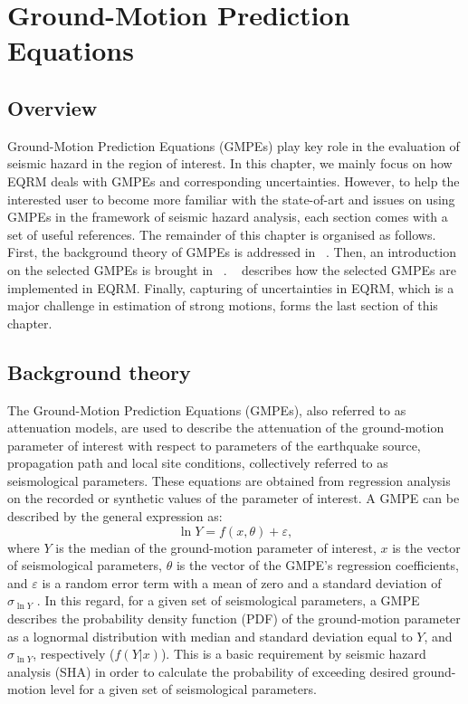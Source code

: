 \chapter{Ground-Motion Prediction Equations}
\label{ch:atten}

\newcommand{\Rhyp}{R_{\mathrm{hyp}}}
\newcommand{\Repi}{R_{\mathrm{epi}}}
\newcommand{\Rrup}{R_{\mathrm{rup}}}
\newcommand{\Rjb}{R_{\mathrm{jb}}}

\section{Overview}

Ground-Motion Prediction Equations (GMPEs) play key role in the
evaluation of seismic hazard in the region of interest. In this
chapter, we mainly focus on how EQRM deals with GMPEs and
corresponding uncertainties. However, to help the interested user to
become more familiar with the state-of-art and issues on using GMPEs
in the framework of seismic hazard analysis, each section comes with
a set of useful references. The remainder of this chapter is
organised as follows. First, the background theory of GMPEs is
addressed in ~. Then, an introduction on the
selected GMPEs is brought in ~.
~ describes how the selected GMPEs are
implemented in EQRM. Finally, capturing of uncertainties in EQRM,
which is a major challenge in estimation of strong motions, forms
the last section of this chapter.


\section{Background theory} \label{sec:background} The
Ground-Motion Prediction Equations (GMPEs), also referred to as
attenuation models, are used to describe the attenuation of the
ground-motion parameter of interest with respect to parameters of
the earthquake source, propagation path and local site conditions,
collectively referred to as seismological parameters. These
equations are obtained from regression analysis on the recorded or
synthetic values of the parameter of interest. A GMPE can be
described by the general expression as:
\begin{equation}\label{eq:general}
\ln Y =f(x,\theta)+\varepsilon,
\end{equation}
where $Y$ is the median of the ground-motion parameter of interest,
$x$ is the vector of seismological parameters, $\theta$ is the
vector of the GMPE’s regression coefficients, and $\varepsilon$ is
a random error term with a mean of zero and a standard deviation of
$\sigma_{\ln Y}$ . In this regard, for a given set of seismological
parameters, a GMPE describes the probability density function (PDF)
of the ground-motion parameter as a lognormal distribution with
median and standard deviation equal to $Y$, and  $\sigma_{\ln Y}$,
respectively ($f(Y|x)$). This is a basic requirement by seismic
hazard analysis (SHA) in order to calculate the probability of
exceeding desired ground-motion level for a given set of
seismological parameters.

